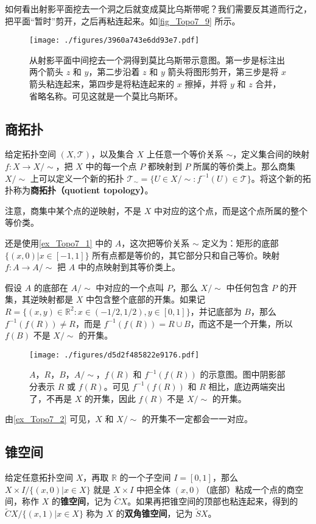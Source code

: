 如何看出射影平面挖去一个洞之后就变成莫比乌斯带呢？我们需要反其道而行之，把平面“暂时”剪开，之后再粘连起来。如\autoref{fig_Topo7_9} 所示。

\begin{figure}[ht]
\centering
\texttt{[image: ./figures/3960a743e6dd93e7.pdf]}
\caption{从射影平面中间挖去一个洞得到莫比乌斯带示意图。第一步是标注出两个箭头 $z$ 和 $y$，第二步沿着 $z$ 和 $y$ 箭头将图形剪开，第三步是将 $x$ 箭头粘连起来，第四步是将粘连起来的 $x$ 擦掉，并将 $y$ 和 $z$ 合并，省略名称。可见这就是一个莫比乌斯环。} \label{fig_Topo7_9}
\end{figure}

\subsection{商拓扑}

给定拓扑空间 $(X, \mathcal{T})$，以及集合 $X$ 上任意一个等价关系 $\sim$，定义集合间的映射 $f:X\rightarrow X/\sim$，把 $X$ 中的每一个点 $P$ 都映射到 $P$ 所属的等价类上。那么商集 $X/\sim$ 上可以定义一个新的拓扑 $\mathcal{T}_\sim=\{U\in X/\sim: f^{-1}(U)\in\mathcal{T}\}$。将这个新的拓扑称为\textbf{商拓扑（quotient topology）}。

注意，商集中某个点的逆映射，不是 $X$ 中对应的这个点，而是这个点所属的整个等价类。

\begin{example}{}\label{ex_Topo7_2}

还是使用\autoref{ex_Topo7_1} 中的 $A$，这次把等价关系 $\sim$ 定义为：矩形的底部 $\{(x,0)|x\in[-1,1]\}$ 所有点都是等价的，其它部分只和自己等价。映射 $f:A\rightarrow A/\sim$ 把 $A$ 中的点映射到其等价类上。

假设 $A$ 的底部在 $A/\sim$ 中对应的一个点叫 $P$，那么 $X/\sim$ 中任何包含 $P$ 的开集，其逆映射都是 $X$ 中包含整个底部的开集。如果记 $R=\{(x,y)\in\mathbb{R}^2:x\in(-1/2,1/2),y\in[0,1]\}$，并记底部为 $B$，那么 $f^{-1}(f(R))\not=R$，而是 $f^{-1}(f(R))=R\cup B$，而这不是一个开集，所以 $f(B)$ 不是 $X/\sim$ 的开集。


\begin{figure}[ht]
\centering
\texttt{[image: ./figures/d5d2f485822e9176.pdf]}
\caption{$A$，$R$，$B$，$A/\sim$，$f(R)$ 和 $f^{-1}(f(R))$ 的示意图。图中阴影部分表示 $R$ 或 $f(R)$。可见 $f^{-1}(f(R))$ 和 $R$ 相比，底边两端突出了，不再是 $X$ 的开集，因此 $f(R)$ 不是 $X/\sim$ 的开集。} \label{fig_Topo7_7}
\end{figure}

\end{example}

由\autoref{ex_Topo7_2} 可见，$X$ 和 $X/\sim$ 的开集不一定都会一一对应。

\subsection{锥空间}

给定任意拓扑空间 $X$，再取 $\mathbb{R}$ 的一个子空间 $I=[0,1]$，那么 $X\times I/\{(x,0)|x\in X\}$ 就是 $X\times I$ 中把全体 $(x, 0)$（底部）粘成一个点的商空间，称作 $X$ 的\textbf{锥空间}，记为 $\widetilde{C}X$。如果再把锥空间的顶部也粘连起来，得到的 $\widetilde{C}X/\{(x,1)|x\in X\}$ 称为 $X$ 的\textbf{双角锥空间}，记为 $\widetilde{S}X$。


